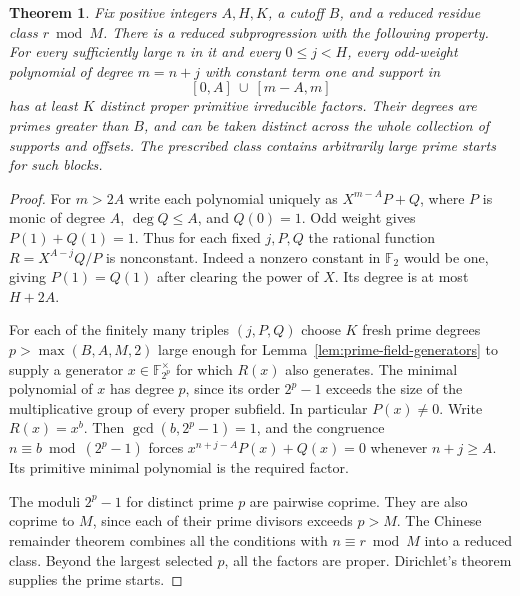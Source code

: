\documentclass[11pt]{article}
\newtheorem{theorem}{Theorem}
\newcommand{\F}{\mathbb F_2}
\begin{document}
\begin{theorem}\label{thm:primitive-factor-block}
Fix positive integers \(A,H,K\), a cutoff \(B\), and a reduced residue
class \(r\bmod M\). There is a reduced subprogression with the following
property. For every sufficiently large \(n\) in it and every \(0\le j<H\),
every odd-weight polynomial of degree \(m=n+j\) with constant term one
and support in
\[
 [0,A]\ \cup\ [m-A,m]
\]
has at least \(K\) distinct proper primitive irreducible factors.
Their degrees are primes greater than \(B\), and can be taken distinct
across the whole collection of supports and offsets. The prescribed class contains arbitrarily large prime starts for such
blocks.
\end{theorem}
\begin{proof}
For \(m>2A\) write each polynomial uniquely as \(X^{m-A}P+Q\), where
\(P\) is monic of degree \(A\), \(\deg Q\le A\), and \(Q(0)=1\).
Odd weight gives \(P(1)+Q(1)=1\). Thus for each fixed \(j,P,Q\) the
rational function \(R=X^{A-j}Q/P\) is nonconstant. Indeed a nonzero
constant in \(\F\) would be one, giving \(P(1)=Q(1)\) after clearing
the power of \(X\). Its degree is at most \(H+2A\).

For each of the finitely many triples \((j,P,Q)\) choose \(K\) fresh
prime degrees \(p>\max(B,A,M,2)\) large enough for
Lemma~\ref{lem:prime-field-generators} to supply a generator
\(x\in\mathbb F_{2^p}^{\times}\) for which \(R(x)\) also generates.
The minimal polynomial of \(x\) has degree \(p\), since its order
\(2^p-1\) exceeds the size of the multiplicative group of every proper
subfield. In particular \(P(x)\ne0\). Write \(R(x)=x^b\). Then
\(\gcd(b,2^p-1)=1\), and the congruence \(n\equiv b\bmod(2^p-1)\)
forces \(x^{n+j-A}P(x)+Q(x)=0\) whenever \(n+j\ge A\).
Its primitive minimal polynomial is the required factor.

The moduli \(2^p-1\) for distinct prime \(p\) are pairwise coprime.
They are also coprime to \(M\), since each of their prime divisors
exceeds \(p>M\). The Chinese remainder theorem combines all the
conditions with \(n\equiv r\bmod M\) into a reduced class.
Beyond the largest selected \(p\), all the factors are proper.
Dirichlet's theorem supplies the prime starts.
\end{proof}
\end{document}
